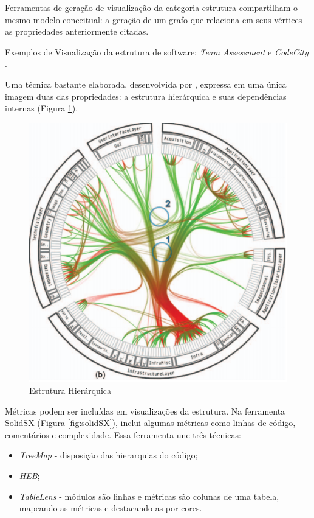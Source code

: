 Ferramentas de geração de visualização da categoria estrutura compartilham o
mesmo modelo conceitual: a geração de um grafo que relaciona em seus vértices
as propriedades anteriormente citadas.

Exemplos de Visualização da estrutura de software: \textit{Team Assessment}
\cite{telea2009case} e \textit{CodeCity} \cite{wettel2008codecity}.

Uma técnica bastante elaborada, desenvolvida por ,
expressa em uma única imagem duas das propriedades: a estrutura hierárquica e
suas dependências internas (Figura \ref{fig:heb}).

\begin{figure}[!htb]
  \centering
    \includegraphics[keepaspectratio=true,scale=0.5]
    {figuras/heb.eps}
  \caption{Estrutura Hierárquica \cite{holten2006hierarchical}}
  \label{fig:heb}
\end{figure}

Métricas podem ser incluídas em visualizações da estrutura. Na ferramenta
SolidSX (Figura \ref{fig:solidSX}),  inclui
algumas métricas como linhas de código, comentários e complexidade. Essa
ferramenta une três técnicas:

\begin{itemize}
	\item \textit{TreeMap} - disposição das hierarquias do código;
	\item \textit{HEB};
	\item \textit{TableLens} - módulos são linhas e métricas são colunas de uma
	tabela, mapeando as métricas e destacando-as por cores.
\end{itemize}

